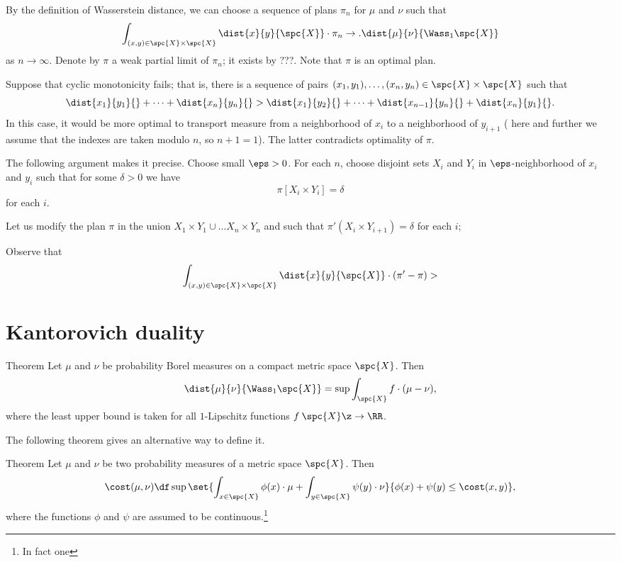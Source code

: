 By the definition of Wasserstein distance, we can choose a sequence of plans $\pi_n$ for $\mu$ and $\nu$ such that 
\[\int_{(x,y)\in\spc{X}\times\spc{X}}\dist{x}{y}{\spc{X}}\cdot\pi_n\to .\dist{\mu}{\nu}{\Wass_1\spc{X}}\]
as $n\to \infty$.
Denote by $\pi$ a weak partial limit of $\pi_n$;
it exists by ???.
Note that $\pi$ is an optimal plan.

Suppose that cyclic monotonicity fails;
that is, there is a sequence of pairs $(x_1,y_1),\dots,(x_n,y_n)\in\spc{X}\times\spc{X}$ such that
\[\dist{x_1}{y_1}{}+\dots+\dist{x_n}{y_n}{}
>
\dist{x_1}{y_2}{}+\dots+\dist{x_{n-1}}{y_n}{}+\dist{x_{n}}{y_1}{}.\]
In this case, it would be more optimal to transport measure from a neighborhood of $x_i$ to a neighborhood of $y_{i+1}$ (
here and further we assume that the indexes are taken modulo $n$, so $n+1=1$).
The latter contradicts optimality of $\pi$.

The following argument makes it precise.
Choose small $\eps>0$.
For each $n$,
choose disjoint sets $X_i$ and $Y_i$ in $\eps$-neighborhood of $x_i$ and $y_i$
such that for some $\delta>0$ we have 
\[\pi [X_i\times Y_i]=\delta\]
for each $i$.

Let us modify the plan $\pi$ in the union $X_1\times Y_1\cup \dots X_n\times Y_n$ and such that 
$\pi'(X_i\times Y_{i+1})=\delta$ for each $i$;


Observe that
\[\int_{(x,y)\in\spc{X}\times\spc{X}}\dist{x}{y}{\spc{X}}\cdot(\pi'-\pi)>\]
\qeds


\section{Kantorovich duality}


\begin{thm}{Theorem}
Let $\mu$ and $\nu$ be probability Borel measures on a compact metric space $\spc{X}$.
Then
\[\dist{\mu}{\nu}{\Wass_1\spc{X}}=\sup\int_{\spc{X}} f\cdot(\mu-\nu),\]
where the least upper bound is taken for all $1$-Lipschitz functions $f\:\spc{X}\z\to\RR$.
\end{thm}


The following theorem gives an alternative way to define it.

\begin{thm}{Theorem}
Let $\mu$ and $\nu$ be two probability measures of a metric space $\spc{X}$.
Then 
\[\cost(\mu,\nu)
\df
\sup\set{\int_{x\in\spc{X}}\phi(x)\cdot\mu+\int_{y\in\spc{X}}\psi(y)\cdot\nu}{\phi(x)+\psi(y)\le \cost(x,y)},\]
where the functions $\phi$ and $\psi$ are assumed to be continuous.\footnote{In fact one }
\end{thm}





